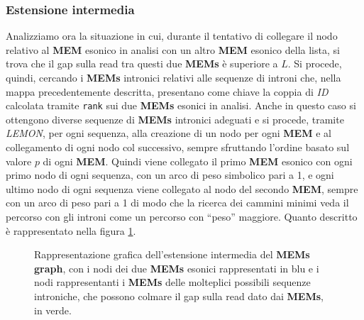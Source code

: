 \documentclass[a4paper,12pt, oneside]{book}
\begin{document}
\subsubsection{Estensione intermedia}
Analizziamo ora la situazione in cui, durante il tentativo di collegare il nodo
relativo al \textbf{MEM} esonico in analisi con un altro \textbf{MEM} esonico
della lista, si trova che il gap sulla read tra questi due \textbf{MEMs} è
superiore a $L$. Si procede, quindi, cercando i \textbf{MEMs} intronici relativi
alle sequenze di introni che, nella mappa precedentemente descritta, presentano
come chiave la coppia di \textit{ID} calcolata tramite \texttt{rank} sui due
\textbf{MEMs} esonici in analisi. Anche in questo caso si ottengono diverse
sequenze di \textbf{MEMs} intronici adeguati e si procede, tramite
\textit{LEMON}, per ogni sequenza, alla creazione di un nodo per ogni
\textbf{MEM} e al collegamento di ogni nodo col successivo, sempre sfruttando
l'ordine basato sul valore $p$ di ogni \textbf{MEM}. Quindi viene collegato il
primo \textbf{MEM} esonico con ogni primo nodo di ogni sequenza, con un arco di
peso simbolico pari a 1, e ogni ultimo nodo di ogni sequenza viene collegato al
nodo del secondo \textbf{MEM}, sempre con un arco di peso pari a 1 di modo che
la ricerca dei cammini minimi veda il percorso con gli introni come un percorso
con ``peso'' maggiore. Quanto descritto è rappresentato nella figura \ref{mid}.
\begin{figure}
  \centering
  
  \caption{Rappresentazione grafica dell'estensione intermedia del \textbf{MEMs
      graph}, con i nodi dei due \textbf{MEMs} esonici rappresentati in blu e i
    nodi rappresentanti i \textbf{MEMs} delle molteplici possibili sequenze
    introniche, che possono colmare il gap sulla read dato dai \textbf{MEMs}, in
    verde.}
  \label{mid}
\end{figure}
\end{document}
